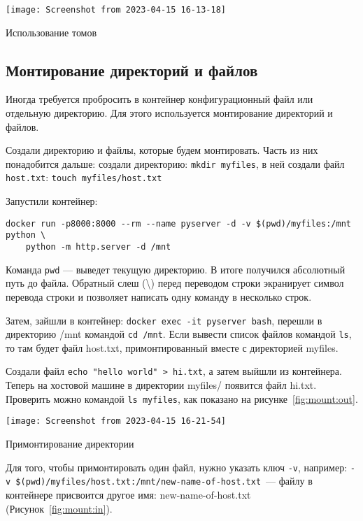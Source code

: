 \begin{image}
	\texttt{[image: Screenshot from 2023-04-15 16-13-18]}
	\caption{Использование томов}
	\label{fig:tom}
\end{image}

\subsection{Монтирование директорий и файлов}
Иногда требуется пробросить в контейнер конфигурационный файл
или отдельную директорию. Для этого используется монтирование директорий
и файлов.\par
Создали директорию и файлы, которые будем монтировать.
Часть из них понадобится дальше: создали директорию:
\texttt{mkdir myfiles}, в ней создали файл \texttt{host.txt}:
\texttt{touch myfiles/host.txt}\par
Запустили контейнер:

\begin{verbatim}
docker run -p8000:8000 --rm --name pyserver -d -v $(pwd)/myfiles:/mnt python \
	python -m http.server -d /mnt
\end{verbatim}

Команда \texttt{pwd} --- выведет текущую директорию.
В итоге получился абсолютный путь до файла.
Обратный слеш (\textbackslash) перед переводом строки экранирует символ
перевода строки и позволяет написать одну команду в несколько строк.\par
Затем, зайшли в контейнер: \texttt{docker exec -it pyserver bash},
перешли в директорию /mnt командой \texttt{cd /mnt}.
Если вывести список файлов командой \texttt{ls}, то там будет файл host.txt,
примонтированный вместе с директорией myfiles.\par
Создали файл \verb|echo "hello world" > hi.txt|, а затем выйшли
из контейнера. Теперь на хостовой машине в директории myfiles/ появится файл
hi.txt. Проверить можно командой \texttt{ls myfiles}, как
показано на рисунке~\ref{fig:mount:out}.\par

\begin{image}
	\texttt{[image: Screenshot from 2023-04-15 16-21-54]}
	\caption{Примонтирование директории}
	\label{fig:mount:out}
\end{image}

Для того, чтобы примонтировать один файл, нужно указать ключ \texttt{-v},
например:
\verb|-v $(pwd)/myfiles/host.txt:/mnt/new-name-of-host.txt|~--- файлу
в контейнере присвоится другое имя: new-name-of-host.txt
(Рисунок~\ref{fig:mount:in}).


